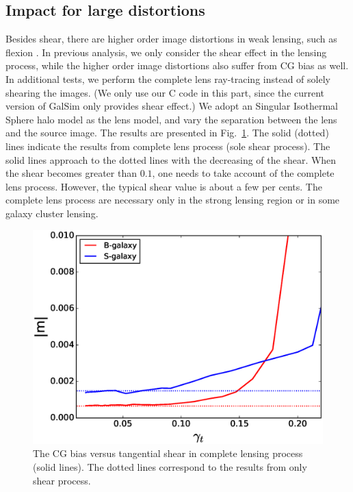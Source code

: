 \documentclass[useAMS,usenatbib]{mnras}
\begin{document}
\subsection{Impact for large distortions}

Besides shear, there are higher order image distortions in weak lensing,
such as flexion \citep[e.g.][]{2002ApJ...564...65G,bacon2006}. In
previous analysis, we only consider the shear effect in the lensing
process, while the higher order image distortions also suffer from CG
bias as well. In additional tests, we perform the complete lens
ray-tracing instead of solely shearing the images. (We only use our C
code in this part, since the current version of GalSim only provides
shear effect.) We adopt an Singular Isothermal Sphere halo model as
the lens model, and vary the separation between the lens and the source image.
The results are presented in Fig.~\ref{fig:biasofgamma}. The solid (dotted) lines
indicate the results from complete lens process (sole shear process).
The solid lines approach to the dotted lines with the decreasing of the
shear. When the shear becomes greater than $0.1$, one needs to take account
of the complete lens process. However, the typical shear value is about a few
per cents. The complete lens process are necessary only in the strong lensing
region or in some galaxy cluster lensing. 
%
\begin{figure}
  \centerline{\includegraphics[width=\hsize]{zcg_sis.eps}}
  \caption{The CG bias versus tangential shear in complete lensing
    process (solid lines). The dotted lines correspond to the results
    from only shear process. }
  \label{fig:biasofgamma}
\end{figure}
%
\end{document}
